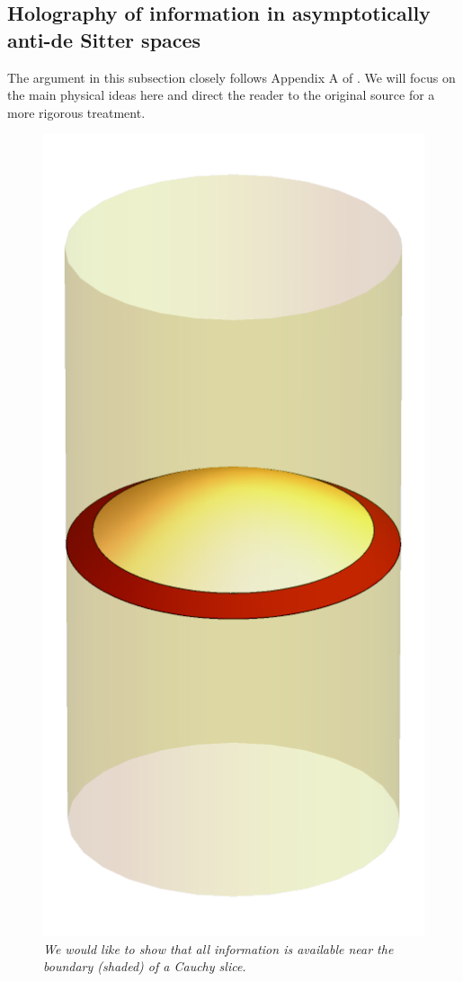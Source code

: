 \documentclass[12pt]{article}
\begin{document}
\subsection{Holography of information in asymptotically anti-de Sitter spaces \label{holinfads}}
The argument in this subsection closely follows Appendix A of \cite{Laddha:2020kvp}. We will focus on the main physical ideas here and direct the reader to the original source for a more rigorous treatment.


\begin{figure}[!ht]
\begin{center}
\includegraphics[height=0.4\textheight]{cylinderwithslice.pdf}
\caption{\em  We would like to show that all information is available near the boundary (shaded) of a Cauchy slice. \label{figobservers}}
\end{center}
\end{figure}
\end{document}
